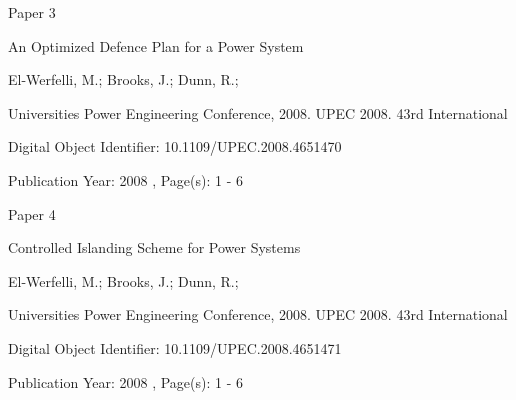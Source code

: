 \documentclass[a4paper,oneside,12pt]{report}
\begin{document}



\begin{center}\begin{large}
{\Huge Paper 3}
\vspace{40px}

An Optimized Defence Plan for a Power System
\vspace{40px}

El-Werfelli, M.; Brooks, J.; Dunn, R.;
\vspace{40px}

Universities Power Engineering Conference, 2008. UPEC 2008. 43rd International
\vspace{40px}

Digital Object Identifier: 10.1109/UPEC.2008.4651470

Publication Year: 2008 , Page(s): 1 - 6
\end{large}\end{center}




\begin{center}\begin{large}
{\Huge Paper 4}
\vspace{40px}

Controlled Islanding Scheme for Power Systems
\vspace{40px}

El-Werfelli, M.; Brooks, J.; Dunn, R.;
\vspace{40px}

Universities Power Engineering Conference, 2008. UPEC 2008. 43rd International
\vspace{40px}

Digital Object Identifier: 10.1109/UPEC.2008.4651471

Publication Year: 2008 , Page(s): 1 - 6
\end{large}\end{center}



\end{document}
